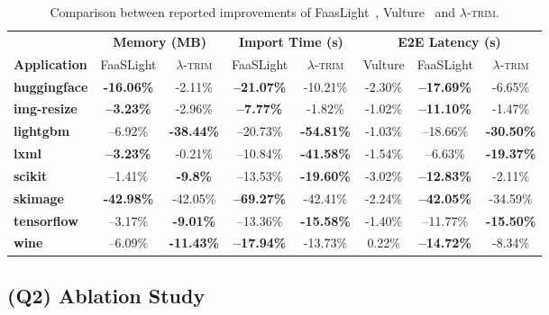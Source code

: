 \documentclass[sigplan,nonacm]{acmart}
\newcommand{\sys}{\textsc{\ensuremath{\lambda}-trim}\xspace}
\newcommand{\application}[1]{{\textcolor{pennblue}{\textbf{#1}}}}
\begin{document}
\begin{table}[t]
\centering
\scriptsize
\setlength{\tabcolsep}{2pt}
\begin{tabularx}{\columnwidth}{Xccccccc}
\toprule
& \multicolumn{2}{c}{\textbf{Memory (MB)}} & \multicolumn{2}{c}{\textbf{Import Time (s)}} & \multicolumn{3}{c}{\textbf{E2E Latency (s)}} \\
\cmidrule(lr){2-3} \cmidrule(lr){4-5} \cmidrule(lr){6-8}
\textbf{Application} & FaaSLight & \sys & FaaSLight & \sys & Vulture & FaaSLight & \sys \\
\midrule
\application{huggingface}        & \textbf{-16.06\%} & -2.11\%  & \textbf{–21.07\%} & -10.21\%        & -2.30\%  & \textbf{–17.69\%} & -6.65\% \\ 
\application{img-resize}       & \textbf{–3.23\%}  &  -2.96\% & \textbf{–7.77\%}  & -1.82\%        &  -1.02\% & \textbf{–11.10\% }      & -1.47\% \\ 
\application{lightgbm}           & –6.92\%  & \textbf{-38.44\%} & –20.73\%          & \textbf{-54.81\%} & -1.03\% & –18.66\% & \textbf{-30.50\%} \\ 
\application{lxml}               & \textbf{–3.23\%}  & -0.21\%  & –10.84\%          & \textbf{-41.58\%} & -1.54\% & –6.63\% & \textbf{-19.37\%} \\ 
\application{scikit}             & –1.41\%  & \textbf{-9.8\%}   & –13.53\%          & \textbf{-19.60\%} & -3.02\% & \textbf{–12.83\%} & -2.11\% \\ 
\application{skimage}            & \textbf{-42.98\%} & -42.05\% & \textbf{–69.27\%} & -42.41\%      & -2.24\%    & \textbf{–42.05\%} & -34.59\% \\ 
\application{tensorflow}         & –3.17\%  & \textbf{-9.01\%}  & –13.36\%          & \textbf{-15.58\%} & -1.40\% & –11.77\% & \textbf{-15.50\%} \\ 
\application{wine}               & –6.09\%  & \textbf{-11.43\%} & \textbf{–17.94\%} & -13.73\%      & 0.22\%    & \textbf{–14.72\%} & -8.34\% \\ 
\bottomrule
\end{tabularx}\caption{Comparison between reported improvements of FaasLight~\cite{faaslight2023}, Vulture~\cite{vulture} and \sys.}
\label{tab:comparison}
\end{table}

%
 


\subsection{(Q2) Ablation Study}
\end{document}
